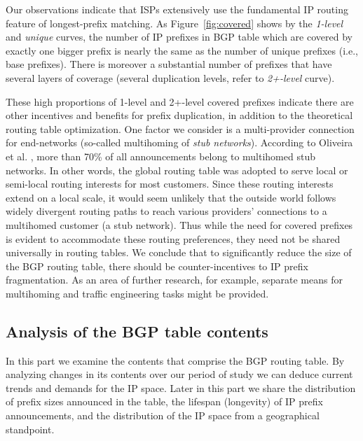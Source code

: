 Our observations indicate that ISPs extensively use the fundamental IP routing
feature of longest-prefix matching. As Figure~\ref{fig:covered} shows by the
\emph{1-level} and \emph{unique} curves, the number of IP prefixes in BGP table
which are covered by exactly one bigger prefix is nearly the same as the number
of unique prefixes (i.e., base prefixes). There is moreover a substantial
number of prefixes that have several layers of coverage (several duplication
levels, refer to \emph{2+-level} curve).

These high proportions of 1-level and 2+-level covered prefixes indicate there
are other incentives and benefits for prefix duplication, in addition to the
theoretical routing table optimization. One factor we consider is a
multi-provider connection for end-networks (so-called multihoming of \emph{stub
networks}). According to Oliveira et al.
\cite{Oliveira:2007:Observing-the-evolution}, more than 70\% of all
announcements belong to multihomed stub networks. In other words, the global
routing table was adopted to serve local or semi-local routing interests for
most customers. Since these routing interests extend on a local scale, it would
seem unlikely that the outside world follows widely divergent routing paths to
reach various providers' connections to a multihomed customer (a stub network).
Thus while the need for covered prefixes is evident to accommodate these
routing preferences, they need not be shared universally in routing tables. We
conclude that to significantly reduce the size of the BGP routing table, there
should be counter-incentives to IP prefix fragmentation. As an area of further
research, for example, separate means for multihoming and traffic engineering
tasks might be provided.

\subsection{Analysis of the BGP table contents}

In this part we examine the contents that comprise the BGP routing table. By
analyzing changes in its contents over our period of study we can deduce
current trends and demands for the IP space. Later in this part we share the
distribution of prefix sizes announced in the table, the lifespan (longevity)
of IP prefix announcements, and the distribution of the IP space from a
geographical standpoint.

